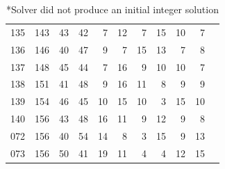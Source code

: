 \begin{table}[!htp]
{\begin{tabular}{lrrrrrrrrrr}
135 & 143 & 43 & 42 & 7 & 12 & 7 & 15 & 10 & 7 \\
136 & 146 & 40 & 47 & 9 & 7 & 15 & 13 & 7 & 8 \\
137 & 148 & 45 & 44 & 7 & 16 & 9 & 10 & 10 & 7 \\
138 & 151 & 41 & 48 & 9 & 16 & 11 & 8 & 9 & 9 \\
139 & 154 & 46 & 45 & 10 & 15 & 10 & 3 & 15 & 10 \\
140 & 156 & 43 & 48 & 16 & 11 & 9 & 12 & 9 & 8 \\
072 & 156 & 40 & 54 & 14 & 8 & 3 & 15 & 9 & 13 \\
073 & 156 & 50 & 41 & 19 & 11 & 4 & 4 & 12 & 15 \\
\bottomrule
\end{tabular}
}
\scriptsize\caption*{*Solver did not produce an initial integer solution}
\end{table}

